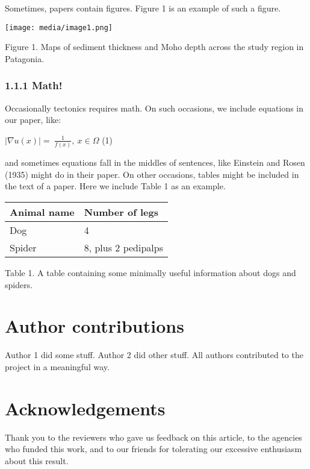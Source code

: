 \documentclass[
]{article}
\begin{document}
Sometimes, papers contain figures. Figure 1 is an example of such a figure.

\texttt{[image: media/image1.png]}

Figure 1. Maps of sediment thickness and Moho depth across the study region in Patagonia.

\hypertarget{math}{%
\subsubsection{1.1.1 Math!}\label{math}}

Occasionally tectonics requires math. On such occasions, we include equations in our paper, like:

\(\left| \nabla u\left( x \right) \right| = \ \frac{1}{f(x)},\ x \in \Omega\) (1)

and sometimes equations fall in the middles of sentences, like Einstein and Rosen (1935) might do in their paper. On other occasions, tables might be included in the text of a paper. Here we include Table 1 as an example.

\begin{longtable}[]{@{}ll@{}}
\toprule
\textbf{Animal name} & \textbf{Number of legs} \\
\midrule
\endhead
Dog & 4 \\
Spider & 8, plus 2 pedipalps \\
\bottomrule
\end{longtable}

Table 1. A table containing some minimally useful information about dogs and spiders.

\hypertarget{author-contributions}{%
\section{Author contributions}\label{author-contributions}}

Author 1 did some stuff. Author 2 did other stuff. All authors contributed to the project in a meaningful way.

\hypertarget{acknowledgements}{%
\section{Acknowledgements}\label{acknowledgements}}

Thank you to the reviewers who gave us feedback on this article, to the agencies who funded this work, and to our friends for tolerating our excessive enthusiasm about this result.
\end{document}

